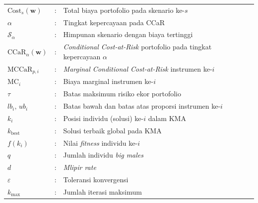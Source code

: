 \begin{longtable}{p{3.2cm}cp{10.3cm}}
$\mathrm{Cost}_s(\mathbf{w})$ & : & Total biaya portofolio pada skenario ke-$s$ \\
$\alpha$ & : & Tingkat kepercayaan pada CCaR \\
$\mathcal{S}_\alpha$ & : & Himpunan skenario dengan biaya tertinggi \\
$\mathrm{CCaR}_\alpha(\mathbf{w})$ & : & \textit{Conditional Cost-at-Risk} portofolio pada tingkat kepercayaan $\alpha$ \\
$\mathrm{MCCaR}_{p,i}$ & : & \textit{Marginal Conditional Cost-at-Risk} instrumen ke-$i$ \\
$\mathrm{MC}_i$ & : & Biaya marginal instrumen ke-$i$ \\
$\tau$ & : & Batas maksimum risiko ekor portofolio \\
$lb_i,\,ub_i$ & : & Batas bawah dan batas atas proporsi instrumen ke-$i$ \\
$k_i$ & : & Posisi individu (solusi) ke-$i$ dalam KMA \\
$k_{\text{best}}$ & : & Solusi terbaik global pada KMA \\
$f(k_i)$ & : & Nilai \textit{fitness} individu ke-$i$ \\
$q$ & : & Jumlah individu \textit{big males} \\
$d$ & : & \textit{Mlipir rate} \\
$\varepsilon$ & : & Toleransi konvergensi \\
$k_{\max}$ & : & Jumlah iterasi maksimum \\

\end{longtable}
